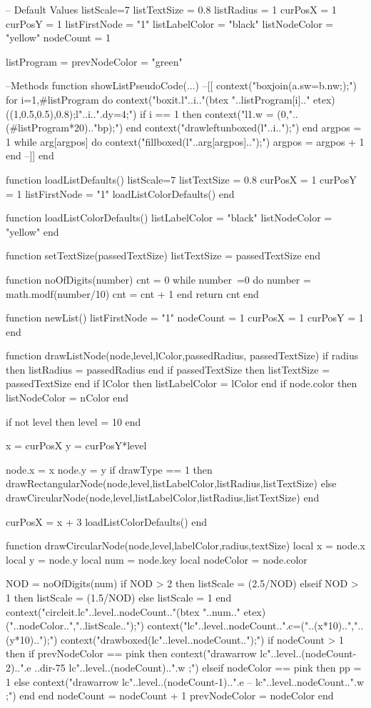

\startluacode

-- Default Values
listScale=7
listTextSize = 0.8
listRadius = 1
curPosX = 1
curPosY = 1
listFirstNode = "1"
listLabelColor = "black"
listNodeColor = "yellow"
nodeCount = 1

listProgram = {}
prevNodeColor = "green"

--Methods
function showListPseudoCode(...)	
	--[[			
	context("boxjoin(a.sw=b.nw;);")
	for i=1,#listProgram do
		context("boxit.l"..i.."(btex "..listProgram[i].."  etex)((1,0.5,0.5),0.8);l"..i..".dy=4;")
		if i == 1 then
			context("l1.w = (0,"..(#listProgram*20).."bp);")
		end
		context("drawleftunboxed(l"..i..");")
	end
	argpos = 1
	while arg[argpos] do  
		context("fillboxed(l"..arg[argpos]..");")
		argpos = argpos + 1
	end 
	--]]
end


function loadListDefaults()
	listScale=7
	listTextSize = 0.8
	curPosX = 1
	curPosY = 1
	listFirstNode = "1"
	loadListColorDefaults()
end

function loadListColorDefaults()
	listLabelColor = "black"
	listNodeColor = "yellow"
end

function setTextSize(passedTextSize)
	listTextSize = passedTextSize
end

function noOfDigits(number)
	cnt = 0
	while number~=0 do
		number = math.modf(number/10)
		cnt = cnt + 1 
	end
	return cnt
end

function newList()
	listFirstNode = "1"
	nodeCount = 1
	curPosX = 1
	curPosY = 1	
end

function drawListNode(node,level,lColor,passedRadius, passedTextSize)
	if radius then
		listRadius = passedRadius
	end
	if passedTextSize then
		listTextSize = passedTextSize
	end
	if lColor then
		listLabelColor = lColor
	end
	if node.color then
		listNodeColor = nColor
	end

	if not level then
		level = 10
	end

	x = curPosX
	y = curPosY*level

	node.x = x
	node.y = y
	if drawType == 1 then	
		drawRectangularNode(node,level,listLabelColor,listRadius,listTextSize)
	else
		drawCircularNode(node,level,listLabelColor,listRadius,listTextSize)
	end

	curPosX = x + 3
	loadListColorDefaults()
end

function drawCircularNode(node,level,labelColor,radius,textSize)
	local x = node.x
	local y = node.y
	local num = node.key
	local nodeColor = node.color

	NOD = noOfDigits(num)
	if NOD > 2 then
		listScale = (2.5/NOD)
	elseif  NOD > 1 then
		listScale = (1.5/NOD)
	else
		listScale = 1
	end
	context("circleit.lc"..level..nodeCount.."(btex "..num.." etex)("..nodeColor..","..listScale..");")
	context("lc"..level..nodeCount..".c=("..(x*10)..","..(y*10)..");")
	context("drawboxed(lc"..level..nodeCount..");")
	if nodeCount > 1 then 
		if prevNodeColor == pink then
			context("drawarrow lc"..level..(nodeCount-2)..".e ..{dir-75} lc"..level..(nodeCount)..".w ;")	
		elseif nodeColor == pink then
			pp = 1
		else
			context("drawarrow lc"..level..(nodeCount-1)..".e -- lc"..level..nodeCount..".w ;")
		end
	end
	nodeCount = nodeCount + 1
	prevNodeColor = nodeColor
end


